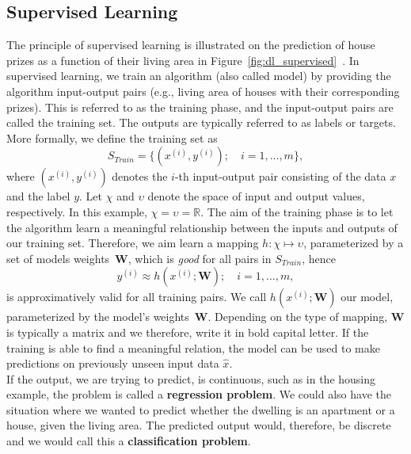 \subsection{Supervised Learning} \label{sec:ml_supervised}
The principle of supervised learning is illustrated on the prediction of house prizes as a function of their living area in Figure~\ref{fig:dl_supervised}~\cite{Ng2012StanfordNotes}. In supervised learning, we train an algorithm (also called model) by providing the algorithm input-output pairs (e.g., living area of houses with their corresponding prizes). This is referred to as the training phase, and the input-output pairs are called the training set. The outputs are typically referred to as labels or targets. More formally, we define the training set as
\begin{equation}
   S_{Train} = \{(x^{(i)}, y^{(i)}); \quad i = 1,...,m\},
   \label{eq:training_set}
\end{equation}
where $(x^{(i)}, y^{(i)})$ denotes the $i$-th input-output pair consisting of the data $x$ and the label $y$. Let $\chi$ and $\upsilon$ denote the space of input and output values, respectively. In this example, $\chi = \upsilon = \mathbb{R}$. The aim of the training phase is to let the algorithm learn a meaningful relationship between the inputs and outputs of our training set. Therefore, we aim learn a mapping $h : \chi \mapsto \upsilon$, parameterized by a set of models weights~$\textbf{W}$, which is \textit{good} for all pairs in $S_{Train}$, hence
\begin{equation}
   y^{(i)} \approx h(x^{(i)}; \mathbf{W}); \quad i = 1,...,m,
   \label{eq:model}
\end{equation}
is approximatively valid for all training pairs. We call $h(x^{(i)}; \mathbf{W})$ our model, parameterized by the model's weights~$\textbf{W}$. Depending on the type of mapping, $\mathbf{W}$ is typically a matrix and we therefore, write it in bold capital letter. If the training is able to find a meaningful relation, the model can be used to make predictions on previously unseen input data $\hat{x}$.\\
If the output, we are trying to predict, is continuous, such as in the housing example, the problem is called a \textbf{regression problem}. We could also have the situation where we wanted to predict whether the dwelling is an apartment or a house, given the living area. The predicted output would, therefore, be discrete and we would call this a \textbf{classification problem}.\\
